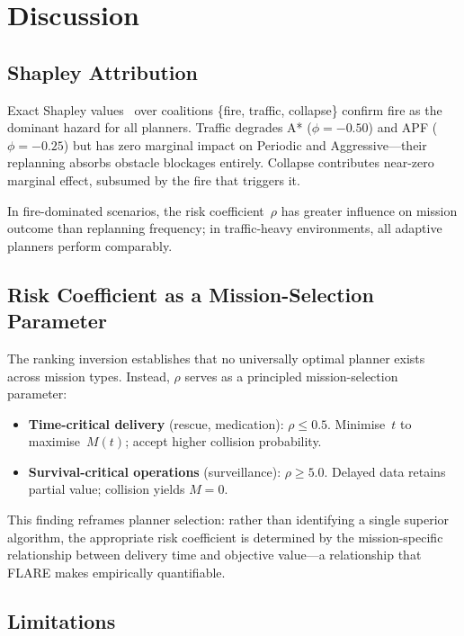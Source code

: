 \documentclass[drones,article,submit,moreauthors]{Definitions/mdpi}
\begin{document}
\section{Discussion}\label{sec:discussion}

\subsection{Shapley Attribution}\label{sec:shapley}

Exact Shapley values~\cite{Shapley1953} over coalitions \{fire, traffic,
collapse\} confirm fire as the dominant hazard for all planners. Traffic
degrades A* ($\phi{=}-0.50$) and APF ($\phi{=}-0.25$) but has zero
marginal impact on Periodic and Aggressive---their replanning absorbs
obstacle blockages entirely. Collapse contributes near-zero marginal effect,
subsumed by the fire that triggers it.

In fire-dominated scenarios, the risk coefficient~$\rho$ has greater
influence on mission outcome than replanning frequency; in traffic-heavy
environments, all adaptive planners perform comparably.

\subsection{Risk Coefficient as a Mission-Selection Parameter}\label{sec:knob}

The ranking inversion establishes that no universally optimal planner
exists across mission types. Instead, $\rho$ serves as a principled
mission-selection parameter:

\begin{itemize}[nosep,leftmargin=*]
  \item \textbf{Time-critical delivery} (rescue, medication): $\rho \leq 0.5$.
    Minimise~$t$ to maximise~$M(t)$; accept higher collision probability.
  \item \textbf{Survival-critical operations} (surveillance): $\rho \geq 5.0$.
    Delayed data retains partial value; collision yields $M{=}0$.
\end{itemize}

This finding reframes planner selection: rather than identifying a
single superior algorithm, the appropriate risk coefficient is
determined by the mission-specific relationship between delivery
time and objective value---a relationship that FLARE makes
empirically quantifiable.

\subsection{Limitations}\label{sec:limitations}
\end{document}

